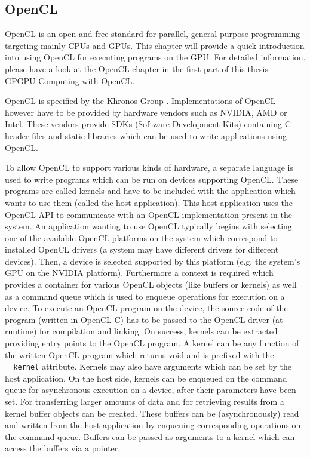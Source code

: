 \subsection{OpenCL}
OpenCL is an open and free standard for parallel, general purpose programming targeting mainly CPUs and GPUs. This chapter will provide a quick introduction into using OpenCL for executing programs on the GPU. For detailed information, please have a look at the OpenCL chapter in the first part of this thesis - GPGPU Computing with OpenCL.

OpenCL is specified by the Khronos Group \cite{opencl_spec}. Implementations of OpenCL however have to be provided by hardware vendors such as NVIDIA, AMD or Intel. These vendors provide SDKs (Software Development Kits) containing C header files and static libraries which can be used to write applications using OpenCL.

To allow OpenCL to support various kinds of hardware, a separate language is used to write programs which can be run on devices supporting OpenCL. These programs are called kernels and have to be included with the application which wants to use them (called the host application). This host application uses the OpenCL API to communicate with an OpenCL implementation present in the system. An application wanting to use OpenCL typically begins with selecting one of the available OpenCL platforms on the system which correspond to installed OpenCL drivers (a system may have different drivers for different devices). Then, a device is selected supported by this platform (e.g. the system's GPU on the NVIDIA platform). Furthermore a context is required which provides a container for various OpenCL objects (like buffers or kernels) as well as a command queue which is used to enqueue operations for execution on a device.
To execute an OpenCL program on the device, the source code of the program (written in OpenCL C) has to be passed to the OpenCL driver (at runtime) for compilation and linking. On success, kernels can be extracted providing entry points to the OpenCL program. A kernel can be any function of the written OpenCL program which returns void and is prefixed with the \lstinline!__kernel! attribute. Kernels may also have arguments which can be set by the host application. On the host side, kernels can be enqueued on the command queue for asynchronous execution on a device, after their parameters have been set. For transferring larger amounts of data and for retrieving results from a kernel buffer objects can be created. These buffers can be (asynchronously) read and written from the host application by enqueuing corresponding operations on the command queue. Buffers can be passed as arguments to a kernel which can access the buffers via a pointer.

